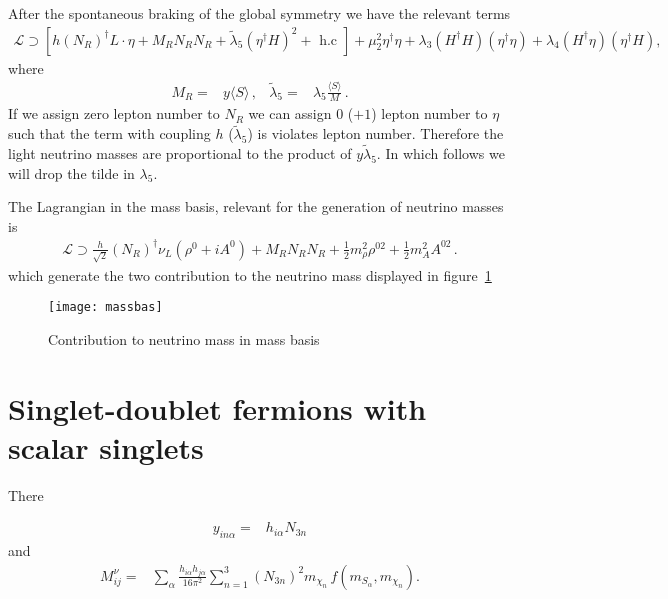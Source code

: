 After the spontaneous braking of the global symmetry we have the relevant terms
\begin{align}
  \mathcal{L}\supset \left[ h \left( N_R \right)^{\dagger} L \cdot \eta + M_R N_R N_R  +
  \widetilde{\lambda}_{5}\left(\eta^{\dagger} H\right)^{2}+\text { h.c } \right]
  +\mu_{2}^{2} \eta^{\dagger} \eta+\lambda_{3}\left(H^{\dagger} H\right)\left(\eta^{\dagger} \eta\right)+\lambda_{4}\left(H^{\dagger} \eta\right)\left(\eta^{\dagger} H\right),
\end{align}
where
\begin{align}
 M_R=& y \langle S \rangle\,,& \widetilde{\lambda}_5=&\lambda_5 \frac{\langle S \rangle }{M}\,.
\end{align}
If we assign zero lepton number to $N_R$ we can assign $0$ ($+1$)
lepton number to $\eta$ such that the term with coupling $h$
($\widetilde{\lambda}_5$) is violates lepton number. Therefore the
light neutrino masses are proportional to the product of
$y \widetilde{\lambda}_5$. In which follows we will drop the tilde in
$\lambda_5$.

The Lagrangian in the mass basis, relevant for the generation of neutrino masses is
\begin{align}
  \mathcal{L}\supset \frac{h}{\sqrt{2}} \left( N_R \right)^{\dagger} \nu_L \left( \rho^0+i A^0  \right)
  + M_R N_R N_R + \frac{1}{2}m_{\rho}^2 \rho^{02}+ \frac{1}{2}m_{A}^2 A^{02}\,.
\end{align}
which generate the two contribution to the neutrino mass displayed in figure~\ref{fig:massbas}

\begin{figure}
  \centering
  \texttt{[image: massbas]}
  \caption{Contribution to neutrino mass in mass basis}
  \label{fig:massbas}
\end{figure}
\section{Singlet-doublet fermions with scalar singlets}
There~\cite{Restrepo:2015ura}

\begin{align}
  y_{i n\alpha}=&h_{i\alpha}N_{3n} 
\end{align}
and 
\begin{align}
   M^{\nu}_{ij}=&\sum_{\alpha}\frac{h_{i\alpha}h_{j\alpha}}{16\pi^2}\sum_{n=1}^3 \left( N_{3n} \right)^2m_{\chi_n}
\,f\left( m_{S_\alpha},m_{\chi_n} \right).
\end{align}

